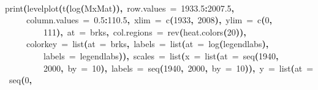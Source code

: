 \documentclass[a4paper]{article}
\newcommand{\hlnumber}[1]{\textcolor[rgb]{0.0823529411764706,0.0784313725490196,0.709803921568627}{#1}}%
\newcommand{\hlfunctioncall}[1]{\textcolor[rgb]{1,0,0}{#1}}%
\newcommand{\hlkeyword}[1]{\textcolor[rgb]{0,0,0}{\textbf{#1}}}%
\newcommand{\hlargument}[1]{\textcolor[rgb]{0.694117647058824,0.247058823529412,0.0196078431372549}{#1}}%
\newcommand{\hlsymbol}[1]{\textcolor[rgb]{0,0,0}{#1}}%
\newcommand{\hlprompt}[1]{\textcolor[rgb]{0,0,0}{#1}}%
\newcommand{\hlstd}[1]{\textcolor[rgb]{0,0,0}{#1}}%
\newenvironment{Houtput}{\raggedright}{%
%
}
\begin{document}
\begin{Houtput}
\normalfont
\hspace*{\fill}\\
\hlstd{}\ttfamily\noindent
\hlprompt{\usebox{\hlnormalsizeboxgreaterthan}{\ }}\hlfunctioncall{print}\hlkeyword{(}\hlfunctioncall{levelplot}\hlkeyword{(}\hlfunctioncall{t}\hlkeyword{(}\hlfunctioncall{log}\hlkeyword{(}\hlsymbol{MxMat}\hlkeyword{)}\hlkeyword{)}\hlkeyword{,}{\ }\hlargument{row.values}{\ }\hlargument{=}{\ }\hlnumber{1933.5}\hlkeyword{:}\hlnumber{2007.5}\hlkeyword{,}\hspace*{\fill}\\
\hlstd{}\hlprompt{{\ }}{\ }{\ }{\ }{\ }\hlargument{column.values}{\ }\hlargument{=}{\ }\hlnumber{0.5}\hlkeyword{:}\hlnumber{110.5}\hlkeyword{,}{\ }\hlargument{xlim}{\ }\hlargument{=}{\ }\hlfunctioncall{c}\hlkeyword{(}\hlnumber{1933}\hlkeyword{,}{\ }\hlnumber{2008}\hlkeyword{)}\hlkeyword{,}{\ }\hlargument{ylim}{\ }\hlargument{=}{\ }\hlfunctioncall{c}\hlkeyword{(}\hlnumber{0}\hlkeyword{,}\hspace*{\fill}\\
\hlstd{}\hlprompt{{\ }}{\ }{\ }{\ }{\ }{\ }{\ }{\ }{\ }\hlnumber{111}\hlkeyword{)}\hlkeyword{,}{\ }\hlargument{at}{\ }\hlargument{=}{\ }\hlsymbol{brks}\hlkeyword{,}{\ }\hlargument{col.regions}{\ }\hlargument{=}{\ }\hlfunctioncall{rev}\hlkeyword{(}\hlfunctioncall{heat.colors}\hlkeyword{(}\hlnumber{20}\hlkeyword{)}\hlkeyword{)}\hlkeyword{,}\hspace*{\fill}\\
\hlstd{}\hlprompt{{\ }}{\ }{\ }{\ }{\ }\hlargument{colorkey}{\ }\hlargument{=}{\ }\hlfunctioncall{list}\hlkeyword{(}\hlargument{at}{\ }\hlargument{=}{\ }\hlsymbol{brks}\hlkeyword{,}{\ }\hlargument{labels}{\ }\hlargument{=}{\ }\hlfunctioncall{list}\hlkeyword{(}\hlargument{at}{\ }\hlargument{=}{\ }\hlfunctioncall{log}\hlkeyword{(}\hlsymbol{legendlabs}\hlkeyword{)}\hlkeyword{,}\hspace*{\fill}\\
\hlstd{}\hlprompt{{\ }}{\ }{\ }{\ }{\ }{\ }{\ }{\ }{\ }\hlargument{labels}{\ }\hlargument{=}{\ }\hlsymbol{legendlabs}\hlkeyword{)}\hlkeyword{)}\hlkeyword{,}{\ }\hlargument{scales}{\ }\hlargument{=}{\ }\hlfunctioncall{list}\hlkeyword{(}\hlargument{x}{\ }\hlargument{=}{\ }\hlfunctioncall{list}\hlkeyword{(}\hlargument{at}{\ }\hlargument{=}{\ }\hlfunctioncall{seq}\hlkeyword{(}\hlnumber{1940}\hlkeyword{,}\hspace*{\fill}\\
\hlstd{}\hlprompt{{\ }}{\ }{\ }{\ }{\ }{\ }{\ }{\ }{\ }\hlnumber{2000}\hlkeyword{,}{\ }\hlargument{by}{\ }\hlargument{=}{\ }\hlnumber{10}\hlkeyword{)}\hlkeyword{,}{\ }\hlargument{labels}{\ }\hlargument{=}{\ }\hlfunctioncall{seq}\hlkeyword{(}\hlnumber{1940}\hlkeyword{,}{\ }\hlnumber{2000}\hlkeyword{,}{\ }\hlargument{by}{\ }\hlargument{=}{\ }\hlnumber{10}\hlkeyword{)}\hlkeyword{)}\hlkeyword{,}{\ }\hlargument{y}{\ }\hlargument{=}{\ }\hlfunctioncall{list}\hlkeyword{(}\hlargument{at}{\ }\hlargument{=}{\ }\hlfunctioncall{seq}\hlkeyword{(}\hlnumber{0}\hlkeyword{,}\hspace*{\fill}\\

\end{Houtput}
\end{document}
